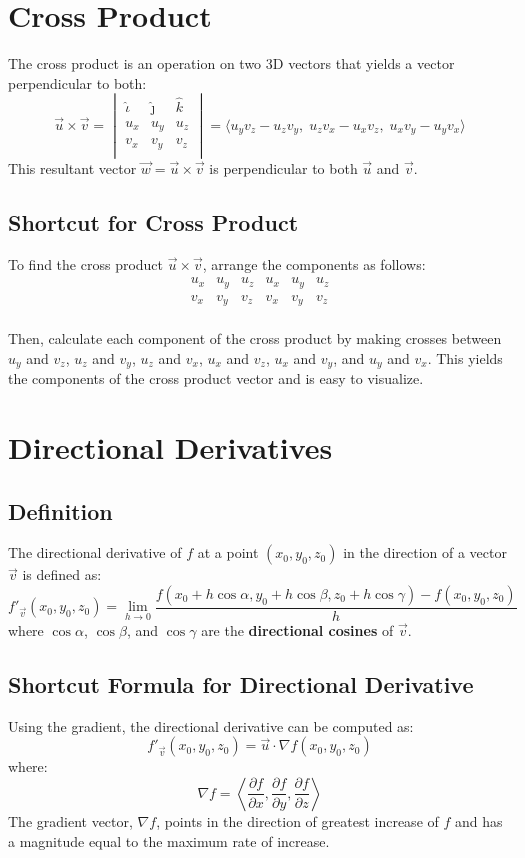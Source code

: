 \documentclass[a4paper,12pt,openany]{book}
\newcommand{\uniti}{
    \hat{\iota}
}
\newcommand{\unitj}{
    \hat{\jmath}
}
\newcommand{\unitk}{
    \hat{k}
}
\begin{document}
\section{Cross Product}
The cross product is an operation on two 3D vectors that yields a vector perpendicular to both:
\[
    \vec{u} \times \vec{v} = 
    \begin{vmatrix}
        \uniti & \unitj & \unitk \\
        u_x & u_y & u_z \\
        v_x & v_y & v_z \\
    \end{vmatrix} 
    = \langle u_y v_z - u_z v_y, \; u_z v_x - u_x v_z, \; u_x v_y - u_y v_x \rangle
\]
This resultant vector \(\vec{w} = \vec{u} \times \vec{v}\) is perpendicular to both \(\vec{u}\) and \(\vec{v}\).
\subsection{Shortcut for Cross Product}

To find the cross product \(\vec{u} \times \vec{v}\), arrange the components as follows:
\[
\begin{array}{|cccccc|}
    u_x & u_y & u_z & u_x & u_y & u_z \\
    v_x & v_y & v_z & v_x & v_y & v_z \\
\end{array}
\]

Then, calculate each component of the cross product by making crosses between $u_y$ and $v_z$, $u_z$ and $v_y$, $u_z$ and $v_x$, $u_x$ and $v_z$, $u_x$ and $v_y$, and $u_y$ and $v_x$. This yields the components of the cross product vector and is easy to visualize.

\section{Directional Derivatives}
\subsection{Definition}
The directional derivative of \(f\) at a point \((x_0, y_0, z_0)\) in the direction of a vector \(\vec{v}\) is defined as:
\[
    f'_{\vec{v}}(x_0, y_0, z_0) = 
    \lim_{h \to 0}
    \frac{
        f(x_0 + h \cos \alpha, y_0 + h \cos \beta, z_0 + h \cos \gamma) - f(x_0, y_0, z_0)
    }{h}
\]
where \(\cos \alpha\), \(\cos \beta\), and \(\cos \gamma\) are the \textbf{directional cosines} of \(\vec{v}\).

\subsection{Shortcut Formula for Directional Derivative}
Using the gradient, the directional derivative can be computed as:
\[
    f'_{\vec{v}}(x_0, y_0, z_0) = \vec{u} \cdot \nabla f(x_0, y_0, z_0)
\]
where:
\[
    \nabla f = \left\langle \frac{\partial f}{\partial x}, \frac{\partial f}{\partial y}, \frac{\partial f}{\partial z} \right\rangle
\]
The gradient vector, \(\nabla f\), points in the direction of greatest increase of \(f\) and has a magnitude equal to the maximum rate of increase.
\end{document}
